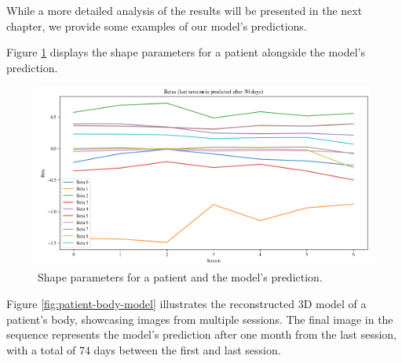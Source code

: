 While a more detailed analysis of the results will be presented in the next
chapter, we provide some examples of our model's predictions.

Figure \ref{fig:predicted-betas} displays the shape parameters for a patient
alongside the model's prediction.

\begin{figure}[h]
    \centering
    \includegraphics[width=\textwidth]{files/predicted_betas}
    \caption{Shape parameters for a patient and the model's prediction.}
    \label{fig:predicted-betas}
\end{figure}

Figure \ref{fig:patient-body-model} illustrates the reconstructed 3D model of a
patient's body, showcasing images from multiple sessions. The final image in
the sequence represents the model's prediction after one month from the last
session, with a total of 74 days between the first and last session.

